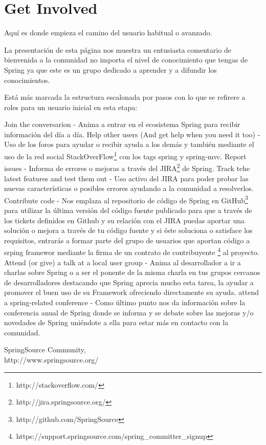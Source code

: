 \documentclass[11pt]{scrartcl}
\begin{document}
\section{Get Involved}

Aquí es donde empieza el camino del usuario habitual o avanzado. 

La presentación de esta página nos muestra un entusiasta comentario de bienvenida a la comunidad no importa el nivel de conocimiento que tengas de Spring ya que este es un grupo dedicado a aprender y a difundir los conocimientos.

Está más marcada la estructura escalonada por pasos con lo que se refirere a roles para un usuario inicial en esta etapa:

    Join the conversarion - Anima a entrar en el ecosistema Spring para recibir información del día a día.
    Help other users (And get help when you need it too) - Uso de los foros para ayudar o recibir ayuda a los demás y también mediante el uso de la red social StackOverFlow\footnote{http://stackoverflow.com/} con los tags spring y spring-mvc.
    Report issues - Informa de errores o mejoras a través del JIRA\footnote{http://jira.springsource.org/} de Spring.
    Track tehe latest features and test them out - Uso activo del JIRA para poder probar las nuevas características o posibles errores ayudando a la comunidad a resolverlos.
    Contribute code - Nos emplaza al repositorio de código de Spring en GitHub\footnote{http://github.com/SpringSource} para utilizar la última versión del código fuente publicado para que a través de los tickets definidos en Github y su relación con el JIRA puedas aportar una solución o mejora a través de tu código fuente y si éste soluciona o satisface los requisitos, entrarás a formar parte del grupo de usuarios que aportan código a srping framewor mediante la firma de un contrato de contribuyente \footnote{https://support.springsource.com/spring\_committer\_signup} al proyecto.
    Attend (or give) a talk at a local user group - Anima al desarrollador a ir a charlas sobre Spring o a ser el ponente de la misma charla en tus grupos cercanos de desarrolladores destacando que Spring aprecia mucho esta tarea, la ayudar a promover el buen uso de su Framework ofreciendo directamente su ayuda.
    attend a spring-related conference - Como último punto nos da información sobre la conferencia anual de Spring donde se informa y se debate sobre las mejoras y/o novedades de Spring uniéndote a ella para estar más en contacto con la comunidad.

\begin{thebibliography}{9}

  SpringSource Community,\\
  http://www.springsource.org/

\end{thebibliography}
\end{document}

